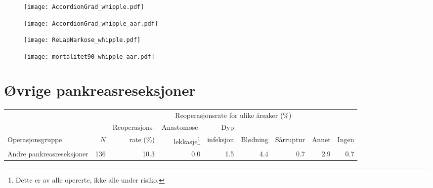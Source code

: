 \documentclass[norsk,a4paper]{article}\usepackage[]{graphicx}\usepackage[]{color}
\begin{document}
\begin{figure}[ht]
\centering
\texttt{[image: AccordionGrad\_whipple.pdf]}
\caption{}
\end{figure}

\begin{figure}[ht]
\centering
\texttt{[image: AccordionGrad\_whipple\_aar.pdf]}
\caption{}
\end{figure}


\begin{figure}[ht]
\centering
\texttt{[image: ReLapNarkose\_whipple.pdf]}
\caption{}
\end{figure}

\begin{figure}[ht]
\centering
\texttt{[image: mortalitet90\_whipple\_aar.pdf]}
\caption{}
\end{figure}

\clearpage

\section{Øvrige pankreasreseksjoner}

\addtolength{\hoffset}{-1.5cm}

\begin{table}[htb]
\begin{minipage}{\textwidth}
\centering
\begin{tabular}{lrrrrrrrr}
  \toprule
  & & & \multicolumn{4}{c}{Reoperasjonsrate for ulike årsaker (\%)} \\
 \cline{4-9} 
 & & Reoperasjons- & Anastomose- & Dyp &&&&  \\
 Operasjonsgruppe & $N$ & rate (\%) & lekkasje\footnote[2]{Dette er av alle opererte, ikke
alle under risiko.} & infeksjon & Blødning & Sårruptur & Annet & Ingen \\
 \midrule
Andre pankreasreseksjoner & 136 & 10.3 & 0.0 & 1.5 & 4.4 & 0.7 & 2.9 & 0.7 \\ 
   \bottomrule
\end{tabular}

\end{minipage}
\end{table}
\end{document}

